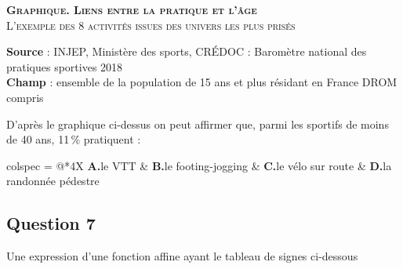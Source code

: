 \documentclass[10pt]{article}
\begin{document}
\begin{center}
	\textbf{\footnotesize\scshape Graphique. Liens entre la pratique et l'âge}\\
	{\footnotesize\scshape L'exemple des 8 activités issues des univers les plus prisés}

	\medskip


	{\tiny\sffamily\textbf{Source} : INJEP, Ministère des sports, CRÉDOC : Baromètre national des pratiques sportives 2018}\\
	{\tiny\sffamily\textbf{Champ} : ensemble de la population de 15 ans et plus résidant en France DROM compris}
\end{center}

D'après le graphique ci-dessus on peut affirmer que, parmi les sportifs de moins de 40 ans, 11\,\% pratiquent :

\medskip
\begin{tblr}{colspec = {@{}*{4}{X}}}
	\textbf{A.}\quad le VTT &
	\textbf{B.}\quad le footing-jogging &
	\textbf{C.}\quad le vélo sur route &
	\textbf{D.}\quad la randonnée pédestre \\
\end{tblr}

\subsection*{Question 7}

Une expression d'une fonction affine ayant le tableau de signes ci-dessous
\end{document}
